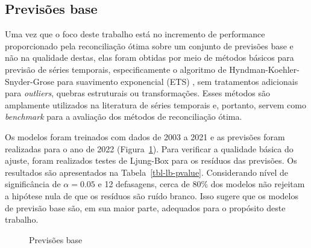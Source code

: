 \documentclass[
  12pt,
  twoside,
  openright,
  a4paper,
  chapter=TITLE,
  section=TITLE,
  brazil]{abntex2}
\begin{document}
\subsection{Previsões base}\label{sec-previsoes_base}

Uma vez que o foco deste trabalho está no incremento de performance
proporcionado pela reconciliação ótima sobre um conjunto de previsões
base e não na qualidade destas, elas foram obtidas por meio de métodos
básicos para previsão de séries temporais, especificamente o algoritmo
de Hyndman-Koehler-Snyder-Grose para suavimento exponencial (ETS)
\autocite{hyndman_state_2002}, sem tratamentos adicionais para
\emph{outliers}, quebras estruturais ou transformações. Esses métodos
são amplamente utilizados na literatura de séries temporais e, portanto,
servem como \emph{benchmark} para a avaliação dos métodos de
reconciliação ótima.

Os modelos foram treinados com dados de 2003 a 2021 e as previsões foram
realizadas para o ano de 2022 (Figura~\ref{fig-modelagem-1}). Para
verificar a qualidade básica do ajuste, foram realizados testes de
Ljung-Box para os resíduos das previsões. Os resultados são apresentados
na Tabela~\ref{tbl-lb-pvalue}. Considerando nível de significância de
\(\alpha=0.05\) e 12 defasagens, cerca de 80\% dos modelos não rejeitam
a hipótese nula de que os resíduos são ruído branco. Isso sugere que os
modelos de previsão base são, em sua maior parte, adequados para o
propósito deste trabalho.

\begin{figure}


\caption{\label{fig-modelagem-1}Previsões base}

\end{figure}%

\begin{table}

\caption{\label{tbl-lb-pvalue}Resultados do teste de Ljung-box para as
previsões base (\(\alpha = 0.05\))}


\end{table}%
\end{document}
